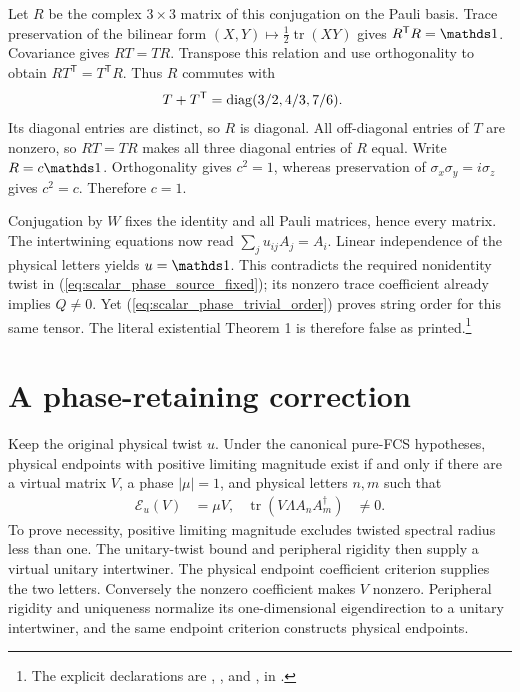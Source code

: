 \documentclass[11pt]{article}
\begin{document}
Let $R$ be the complex $3\times3$ matrix of this conjugation on the Pauli
basis. Trace preservation of the bilinear form
$(X,Y)\mapsto\tfrac12\operatorname{tr}(XY)$ gives $R^{\mathsf T}R=\Id$.
Covariance gives $RT=TR$. Transpose this relation and use orthogonality
to obtain $RT^{\mathsf T}=T^{\mathsf T}R$. Thus $R$ commutes with
\begin{align}
 T+T^{\mathsf T}&=\operatorname{diag}(3/2,4/3,7/6).
 \notag
\end{align}
Its diagonal entries are distinct, so $R$ is diagonal. All off-diagonal
entries of $T$ are nonzero, so $RT=TR$ makes all three diagonal entries of
$R$ equal. Write $R=c\Id$. Orthogonality gives $c^2=1$, whereas preservation
of $\sigma_x\sigma_y=i\sigma_z$ gives $c^2=c$. Therefore $c=1$.

Conjugation by $W$ fixes the identity and all Pauli matrices, hence every
matrix. The intertwining equations now read
$\sum_j u_{ij}A_j=A_i$. Linear independence of the physical letters yields
$u=\Id$. This contradicts the required nonidentity twist in
(\ref{eq:scalar_phase_source_fixed}); its nonzero trace coefficient already
implies $Q\ne0$. Yet (\ref{eq:scalar_phase_trivial_order}) proves string
order for this same tensor. The literal existential Theorem 1 is therefore
false as printed.\footnote{The explicit declarations are
,
, and
,
in .}

\section{A phase-retaining correction}

Keep the original physical twist $u$. Under the canonical pure-FCS
hypotheses, physical endpoints with positive limiting magnitude exist
if and only if there are a virtual matrix $V$, a phase $|\mu|=1$, and
physical letters $n,m$ such that
\begin{align}
 \mathcal E_u(V)&=\mu V,
 &\operatorname{tr}(V\Lambda A_nA_m^\dagger)&\ne0.
 \label{eq:scalar_phase_corrected}
\end{align}
To prove necessity, positive limiting magnitude excludes twisted spectral
radius less than one. The unitary-twist bound and peripheral rigidity then
supply a virtual unitary intertwiner. The physical endpoint coefficient
criterion supplies the two letters. Conversely the nonzero coefficient
makes $V$ nonzero. Peripheral rigidity and uniqueness normalize its
one-dimensional eigendirection to a unitary intertwiner, and the same
endpoint criterion constructs physical endpoints.
\end{document}
